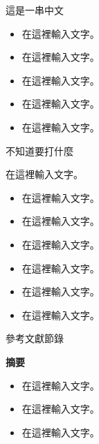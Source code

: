 \documentclass[final,hyperref={pdfpagelabels=false}]{beamer}
\begin{document}
\begin{CJK}{UTF8}{bsmi}
\begin{frame}
\begin{minipage}{0.395\textwidth}
\begin{block}{這是一串中文}
  \begin{itemize}
    \item 在這裡輸入文字。
    \item 在這裡輸入文字。
    \item 在這裡輸入文字。
    \item 在這裡輸入文字。
    \item 在這裡輸入文字。
    \begin{center}
    \end{center}
  \end{itemize}
\end{block}
\end{minipage}
\quad
\begin{minipage}{0.585\textwidth}
\begin{block}{不知道要打什麼}
  \begin{center}
    在這裡輸入文字。
    \vspace*{8mm}
  \end{center}
  \begin{itemize}
    \item 在這裡輸入文字。
    \item 在這裡輸入文字。
    \item 在這裡輸入文字。
    \item 在這裡輸入文字。
    \item 在這裡輸入文字。
    \item 在這裡輸入文字。
  \end{itemize}
\end{block}
\end{minipage}

\begin{minipage}{0.64\textwidth}
\begin{block}{參考文獻節錄}
  \nocite{*}
  
    
\end{block}
\end{minipage}
\quad
\begin{minipage}{0.34\textwidth}
\begin{alertblock}{\textbf{摘要}}
  \begin{itemize}
    \item 在這裡輸入文字。
    \item 在這裡輸入文字。
    \item 在這裡輸入文字。
  \end{itemize}
\end{alertblock}
\end{minipage}

\end{frame}
\end{CJK}
\end{document}
